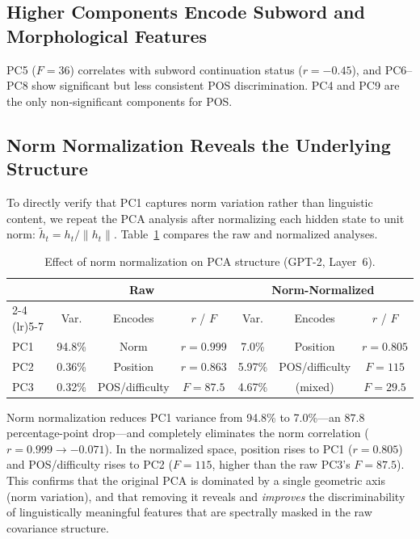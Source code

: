 \documentclass[11pt,a4paper]{article}
\begin{document}
\subsection{Higher Components Encode Subword and Morphological Features}

PC5 ($F = 36$) correlates with subword continuation status ($r = -0.45$), and PC6--PC8 show significant but less consistent POS discrimination. PC4 and PC9 are the only non-significant components for POS.

\subsection{Norm Normalization Reveals the Underlying Structure}

To directly verify that PC1 captures norm variation rather than linguistic content, we repeat the PCA analysis after normalizing each hidden state to unit norm: $\tilde{h}_t = h_t / \|h_t\|$. Table~\ref{tab:normnorm} compares the raw and normalized analyses.

\begin{table}[H]
\centering
\caption{Effect of norm normalization on PCA structure (GPT-2, Layer~6).}
\label{tab:normnorm}
\begin{tabular}{lcccccc}
\toprule
 & \multicolumn{3}{c}{Raw} & \multicolumn{3}{c}{Norm-Normalized} \\
\cmidrule(lr){2-4} \cmidrule(lr){5-7}
 & Var. & Encodes & $r$ / $F$ & Var. & Encodes & $r$ / $F$ \\
\midrule
PC1 & 94.8\% & Norm & $r{=}0.999$ & 7.0\% & Position & $r{=}0.805$ \\
PC2 & 0.36\% & Position & $r{=}0.863$ & 5.97\% & POS/difficulty & $F{=}115$ \\
PC3 & 0.32\% & POS/difficulty & $F{=}87.5$ & 4.67\% & (mixed) & $F{=}29.5$ \\
\bottomrule
\end{tabular}
\end{table}

Norm normalization reduces PC1 variance from 94.8\% to 7.0\%---an $87.8$ percentage-point drop---and completely eliminates the norm correlation ($r = 0.999 \to -0.071$). In the normalized space, position rises to PC1 ($r = 0.805$) and POS/difficulty rises to PC2 ($F = 115$, higher than the raw PC3's $F = 87.5$). This confirms that the original PCA is dominated by a single geometric axis (norm variation), and that removing it reveals and \emph{improves} the discriminability of linguistically meaningful features that are spectrally masked in the raw covariance structure.
\end{document}
